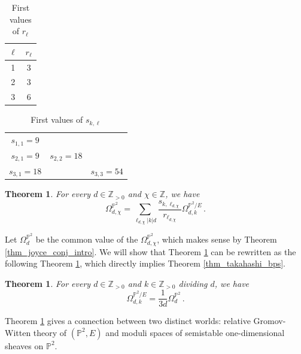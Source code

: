 \documentclass[11pt,letterpaper]{amsart}
\newtheorem{thm}[defn]{Theorem}
\newcommand\PP{\mathbb P}
\newcommand\Z{\mathbb Z}
\begin{document}
\begin{center}
\begin{table}[H]
\begin{tabular}{ c|c }
$\ell$ & $r_\ell$ \\
 \hline
 1 & 3  \\ 
 2 & 3   \\ 
 3 & 6  \\ 
\end{tabular}
\vspace{0.5cm}
\caption{First values of $r_\ell$ \label{table_r}}
\end{table}
\end{center}


\begin{center}
\begin{table}[H]
\begin{tabular}{ |c c c| }
\hline
$s_{1,1}=9$ & & \\
 $s_{2,1}=9$ & $s_{2,2}=18$&  \\ 
 $s_{3,1}=18$ &   & $s_{3,3}=54$ \\
 \hline
\end{tabular}
\vspace{0.5cm}
\caption{First values of $s_{k,\ell}$ \label{table_skl}}
\end{table}
\end{center}

\begin{thm} \label{thm_log_bps_local_bps_intro}
For every $d\in \Z_{>0}$ and $\chi \in \Z$, we have 
\[ 
\Omega_{d,\chi}^{\PP^2}=\sum_{\ell_{d,\chi}|k|d}
\frac{s_{k,\ell_{d,\chi}}}{r_{\ell_{d,\chi}}} \Omega_{d,k}^{\PP^2/E}\,.\]
\end{thm}

Let $\Omega_d^{\PP^2}$ be the common value of the 
$\Omega_{d,\chi}^{\PP^2}$, which makes sense by Theorem 
\ref{thm_joyce_conj_intro}. We will show that Theorem \ref{thm_log_bps_local_bps_intro}
can be rewritten as the following Theorem \ref{thm_local_relative_intro}, which directly implies 
 Theorem 
\ref{thm_takahashi_bps}.

\begin{thm} \label{thm_local_relative_intro}
For every $d \in \Z_{>0}$ and $k \in \Z_{>0}$
dividing $d$, we have 
\[ \Omega_{d,k}^{\PP^2/E}=\frac{1}{3d} \Omega_d^{\PP^2}\,.\]
\end{thm}




Theorem \ref{thm_log_bps_local_bps_intro} gives a connection between two distinct worlds: relative Gromov-Witten theory of $(\PP^2,E)$ and moduli spaces of semistable one-dimensional sheaves on $\PP^2$. 
\end{document}
